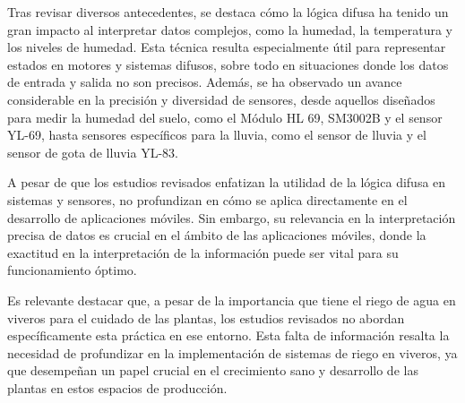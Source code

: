 \bigbreak
Tras revisar diversos antecedentes, se destaca cómo la lógica difusa ha tenido un gran impacto al interpretar datos complejos, como la humedad, la temperatura y los niveles de humedad. Esta técnica resulta especialmente útil para representar estados en motores y sistemas difusos, sobre todo en situaciones donde los datos de entrada y salida no son precisos. Además, se ha observado un avance considerable en la precisión y diversidad de sensores, desde aquellos diseñados para medir la humedad del suelo, como el Módulo HL 69, SM3002B y el sensor YL-69, hasta sensores específicos para la lluvia, como el sensor de lluvia y el sensor de gota de lluvia YL-83.

A pesar de que los estudios revisados enfatizan la utilidad de la lógica difusa
en sistemas y sensores, no profundizan en cómo se aplica directamente en el
desarrollo de aplicaciones móviles. Sin embargo, su relevancia en la
interpretación precisa de datos es crucial en el ámbito de las aplicaciones
móviles, donde la exactitud en la interpretación de la información puede ser
vital para su funcionamiento óptimo.

Es relevante destacar que, a pesar de la importancia que tiene el riego de agua
en viveros para el cuidado de las plantas, los estudios revisados no abordan
específicamente esta práctica en ese entorno. Esta falta de información resalta
la necesidad de profundizar en la implementación de sistemas de riego en
viveros, ya que desempeñan un papel crucial en el crecimiento sano y desarrollo
de las plantas en estos espacios de producción.


